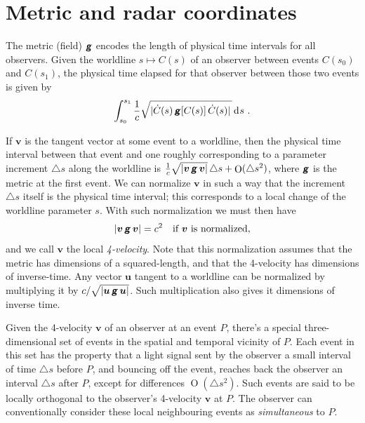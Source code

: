 \documentclass[\ifafour a4paper,12pt,\else a5paper,10pt,\fi%
onecolumn,oneside,article,%
british%
]{memoir}
\theoremstyle{remark}
\theoremstyle{innote}
\newcommand*{\mathte}[1]{\textbf{\textit{\textsf{#1}}}}
\newcommand*{\di}{\mathrm{d}}%
\DeclareMathOperator{\Ord}{O}%
\newcommand*{\incr}{\triangle}%
\DeclarePairedDelimiter\abs{\lvert}{\rvert}
\renewcommand*{\|}[1][]{\nonscript\:#1\vert\nonscript\:\mathopen{}}
\newcommand*{\yg}{\mathte{g}}
\newcommand*{\yv}{\bm{v}}
\newcommand*{\yu}{\bm{u}}
\newcommand*{\ddi}[2][]{\di^{#1}#2}
\begin{document}
\section{Metric and radar coordinates}
\label{sec:metric_radar_coords}

The metric (field) $\yg$ encodes the length of physical time intervals for all observers. Given the worldline $s \mapsto C(s)$ of an observer between events $C(s_{0})$ and $C(s_{1})$, the physical time elapsed for that observer between those two events is given by
\begin{equation}
  \label{eq:proper_time_PQ}
  \int_{s_{0}}^{s_{1}}
  \frac{1}{c}\sqrt{\abs{\dot{C}(s)\,\yg[C(s)]\,\dot{C}(s)}\,}\,\ddi{s} \ .
\end{equation}

If $\yv$ is the tangent vector at some event to a worldline, then the physical time interval between that event and one roughly corresponding to a parameter increment $\incr s$ along the worldline is $\frac{1}{c}\sqrt{\abs{\yv\,\yg\,\yv}}\,\incr s + \Ord(\incr s^{2})$, where $\yg$ is the metric at the first event. We can normalize $\yv$ in such a way that the increment $\incr s$ itself is the physical time interval; this corresponds to a local change of the worldline parameter $s$. With such normalization we must then have
\begin{equation}
  \label{eq:normalize_4-vel}
  \abs{\yv\,\yg\,\yv} = c^{2} \quad\text{if $\yv$ is normalized},
\end{equation}
and we call $\yv$ the local \emph{4-velocity}. Note that this normalization assumes that the metric has dimensions of a squared-length, and that the 4-velocity has dimensions of inverse-time. Any vector $\yu$ tangent to a worldline can be normalized by multiplying it by $c/\sqrt{\abs{\yu\,\yg\,\yu}}$. Such multiplication also gives it dimensions of inverse time.

Given the 4-velocity $\yv$ of an observer at an event $P$, there's a special three-dimensional set of events in the spatial and temporal vicinity of $P$. Each event in this set has the property that a light signal sent by the observer a small interval of time $\incr s$ before $P$, and bouncing off the event, reaches back the observer an interval $\incr s$ after $P$, except for differences $\Ord(\incr s^{2})$. Such events are said to be locally orthogonal to the observer's 4-velocity $\yv$ at $P$. The observer can conventionally consider these local neighbouring events as \emph{simultaneous} to $P$.
\end{document}
